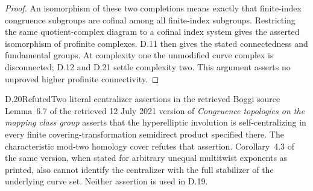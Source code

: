 \begin{proof}
An isomorphism of these two completions means exactly that finite-index congruence subgroups are cofinal among all finite-index subgroups. Restricting the same quotient-complex diagram to a cofinal index system gives the asserted isomorphism of profinite complexes. D.11 then gives the stated connectedness and fundamental groups. At complexity one the unmodified curve complex is disconnected; D.12 and D.21 settle complexity two. This argument asserts no unproved higher profinite connectivity.
\end{proof}

\begin{result}{D.20}{Refuted}{Two literal centralizer assertions in the retrieved Boggi source}
Lemma~6.7 of the retrieved 12 July 2021 version of \emph{Congruence topologies on the mapping class group} asserts that the hyperelliptic involution is self-centralizing in every finite covering-transformation semidirect product specified there. The characteristic mod-two homology cover refutes that assertion. Corollary~4.3 of the same version, when stated for arbitrary unequal multitwist exponents as printed, also cannot identify the centralizer with the full stabilizer of the underlying curve set. Neither assertion is used in D.19.
\end{result}
